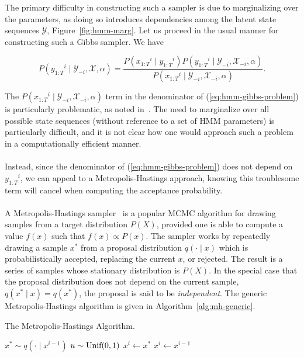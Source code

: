 \documentclass[12pt]{report}
\newcommand{\1}[0]{\mathbbm{1}}
\newcommand{\Unif}[0]{\textnormal{Unif}}
\newcommand{\seq}[3]{\ensuremath{#1_{{#2}:{#3}}}}
\begin{document}
The primary difficulty in constructing such a sampler is due to marginalizing over the parameters,
as doing so introduces dependencies among the latent state sequences $\mathcal{Y}$, Figure~\ref{fig:hmm-marg}.
Let us proceed in the usual manner for constructing such a Gibbs sampler. We have

\begin{equation}
    P(\seq{y}{1}{T}^i \mid \mathcal{Y}_{-i}, \mathcal{X}, \alpha)
    = \frac{P(\seq{x}{1}{T}^i \mid \seq{y}{1}{T}^i)P(\seq{y}{1}{T}^i \mid \mathcal{Y}_{-i}, \mathcal{X}_{-i}, \alpha)}
      {P(\seq{x}{1}{T}^i \mid \mathcal{Y}_{-i}, \mathcal{X}_{-i}, \alpha)}. \label{eq:hmm-gibbs-problem}
\end{equation}

The $P(\seq{x}{1}{T}^i \mid \mathcal{Y}_{-i}, \mathcal{X}_{-i}, \alpha)$ term in the denominator
of (\ref{eq:hmm-gibbs-problem}) is particularly problematic, as noted in~\cite{pcfg-bayesian-johnson}.
The need to marginalize over all possible state sequences (without reference to a set of \ac{HMM} parameters)
is particularly difficult, and it is not clear how one would approach such a problem
in a computationally efficient manner.
\\\\
Instead, since the denominator of (\ref{eq:hmm-gibbs-problem}) does not depend on $\seq{y}{1}{T}^i$,
we can appeal to a Metropolis-Hastings approach, knowing this troublesome term will cancel when
computing the acceptance probability.
\\\\
A Metropolis-Hastings sampler~\cite{mcmc-ml} is a popular \ac{MCMC} algorithm for drawing samples
from a target distribution $P(X)$, provided one is able to compute a value
$f(x)$ such that $f(x) \propto P(x)$. The sampler works by repeatedly drawing a
sample $x^*$ from a proposal distribution $q(\cdot \mid x)$ which is probabilistically
accepted, replacing the current $x$, or rejected. The result is a series of samples
whose stationary distribution is $P(X)$. In the special case that the proposal distribution
does not depend on the current sample, $q(x^* \mid x) = q(x^*)$, the proposal is said to
be \emph{independent}. The generic Metropolis-Hastings algorithm is given in Algorithm~\ref{alg:mh-generic}.

\begin{algorithm}[H]
    \caption{The Metropolis-Hastings Algorithm.\label{alg:mh-generic}}
    \begin{algorithmic}[1]
            \State $x^* \sim q(\cdot \mid x^{i-1})$
            \State $u \sim \Unif(0, 1)$
                \State $x^i \gets x^*$
            \Else
                \State $x^i \gets x^{i-1}$
            \EndIf
        \EndFor
        \State {}
    \end{algorithmic}
\end{algorithm}
\end{document}
